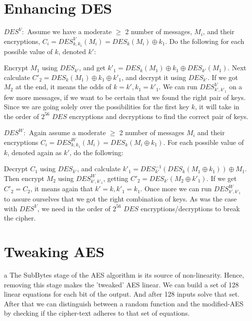 \documentclass{article}
\begin{document}
\section{Enhancing DES}
\begin{paragraph}
	{$DES^V:$} Assume we have a moderate $\geq$ 2 number of messages, $M_i$, and their encryptions, $C_i = DES^V_{k, k_1}(M_i) = DES_k(M_i) \oplus k_1$. Do the following for each possible value of $k$, denoted $k'$:
	
	Encrypt $M_1$ using $DES_{k'}$, and get $k'_1 = DES_k(M_1) \oplus k_1 \oplus DES_{k'}(M_1)$. Next calculate $C'_2 = DES_k(M_1) \oplus k_1 \oplus k'_1$, and decrypt it using $DES_{k'}$. If we got $M_2$ at the end, it means the odds of 
	$k = k', k_1 = k'_1$. We can run $DES^V_{k', k'_1}$ on a few more messages, if we want to be certain that we found the right pair of keys. Since we are going solely over the possibilities for the first key $k$, it will take in the order of $2^{56}$ $DES$ encryptions and decryptions to find the correct pair of keys.
\end{paragraph}

\begin{paragraph}
    {$DES^{W}:$} Again assume a moderate $\geq$ 2 number of messages $M_i$ and their encryptions $C_{i} = DES^{W}_{k, k_1}(M_i) = DES_{k}(M_i \oplus k_1)$. For each possible value of $k$, denoted again as $k'$, do the following:
    
    Decrypt $C_1$ using $DES_{k'}$, and calculate $k'_1 = DES^{-1}_{k'}(DES_k(M_1 \oplus k_1)) \oplus M_1$. Then encrypt $M_2$ using $DES^W_{k', k'_1}$, getting $C'_2 = DES_{k'}(M_2 \oplus k'_1)$. If we get $C'_2 = C_2$, it means again that $k' = k, k'_1 = k_1$. Once more we can run $DES^W_{k', k'_1}$ to assure ourselves that we got the right combination of keys. As was the case with $DES^V$, we need in the order of $2^{56}$ $DES$ encryptions/decryptions to break the cipher.
\end{paragraph}

\section{Tweaking AES}
\begin{paragraph}
	a The SubBytes stage of the AES algorithm is its source of non-linearity.
	Hence, removing this stage makes the 'tweaked' AES linear.
	We can build a set of 128 linear equations for each bit of the output. And after 128 inputs
	solve that set. After that we can distinguish between a random function and the modified-AES
	by checking if the cipher-text adheres to that set of equations.
\end{paragraph}
\end{document}
